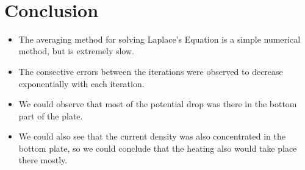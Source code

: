 \documentclass[11pt]{article}
\providecommand{\tightlist}{%
      \setlength{\itemsep}{0pt}\setlength{\parskip}{0pt}}
\begin{document}
    \begin{center}
    \end{center}
    { \hspace*{\fill} \\}
    
    \hypertarget{conclusion}{%
\section{Conclusion}\label{conclusion}}

\begin{itemize}
\tightlist
\item
  The averaging method for solving Laplace's Equation is a simple
  numerical method, but is extremely slow.
\item
  The consective errors between the iterations were observed to decrease
  exponentially with each iteration.
\item
  We could observe that most of the potential drop was there in the
  bottom part of the plate.
\item
  We could also see that the current density was also concentrated in
  the bottom plate, so we could conclude that the heating also would
  take place there mostly.
\end{itemize}


    
    
    
    
\end{document}
